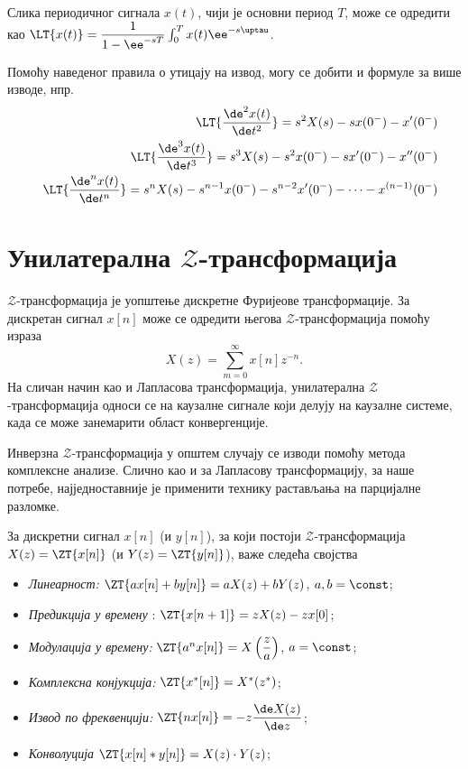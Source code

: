 Слика периодичног сигнала $x(t)$, чији је основни период $T$, може се одредити као 
$\LT{x(t)} = \dfrac{1}{1 - \ee^{-sT}} \int_0^T x(t) \ee^{-s\uptau}$.

Помоћу наведеног правила о утицају на извод, могу се добити и формуле за више изводе, нпр.
\begin{eqnarray}
    && \LT{ \dfrac{\de^2 x(t)}{\de t^2} } = s^2 X(s) - s x(0^-) - x'(0^-) \\
    && \LT{ \dfrac{\de^3 x(t)}{\de t^3} } = s^3 X(s) - s^2 x(0^-) - s x'(0^-) - x''(0^-) \\
    && \LT{ \dfrac{\de^n x(t)}{\de t^n} } = s^n X(s) - s^{n-1} x(0^-) - s^{n-2} x'(0^-) - \cdots - x^{(n-1)} (0^-) 
\end{eqnarray}


\section*{Унилатерална $\mathcal{Z}$-трансформација}

$\mathcal{Z}$-трансформација је уопштење дискретне Фуријеове трансформације. За дискретан сигнал $x[n]$ може се одредити
његова $\mathcal{Z}$-трансформација помоћу израза 
\begin{equation}
        X(z) = \sum_{m = 0}^{\infty} x[n] z^{-n}.
\end{equation}
На сличан начин као и Лапласова трансформација, унилатерална $\mathcal{Z}$-трансформација односи се на каузалне сигнале 
који делују на каузалне системе, када се може занемарити област конвергенције.

Инверзна $\mathcal{Z}$-трансформација у општем случају се изводи помоћу метода комплексне анализе. 
Слично као и за Лапласову трансформацију, за наше потребе, најједноставније је 
применити технику растављања на парцијалне разломке.

За дискретни сигнал $x[n]$ (и $y[n]$), за који постоји $\mathcal{Z}$-трансформација
$X(z) = \ZT{x[n]}$ (и $Y(z) = \ZT{y[n]}$), важе следећа својства
\begin{itemize}
    \item \emph{Линеарност:} $\ZT{ax[n] + by[n]} = a X(z) + b Y(z)$, \qquad $a,b = \const$;
    \item \emph{Предикција у времену} : $\ZT{x[n+1]} = z X(z) - z x[0]$;
    \item \emph{Модулација у времену:} $\ZT{ a^n x[n] } = X \left(\dfrac{z}{a}\right)$, \qquad $a = \const$;
    \item \emph{Комплексна конјукција:} $\ZT{ x^{\ast}[n] } = X^{\ast}(z^{\ast})$;
    \item \emph{Извод по фреквенцији:} $\ZT{n x[n]} = -z \dfrac{\de X(z) }{\de z}$;
    \item \emph{Конволуција} $\ZT{x[n]  \ast y[n]} = X(z) \cdot Y(z)$; 
\end{itemize}